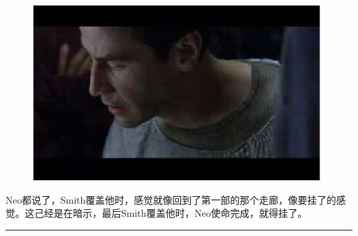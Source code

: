 \documentclass[UTF8]{ctexart}
\newcommand{\myparsep}{\noindent \rule[0.5ex]{\linewidth}{1pt}}
\begin{document}
\begin{figure}[htb]
\centering
\includegraphics[width=0.5\linewidth]{fig/read_reloaded-83}
\end{figure}

Neo都说了，Smith覆盖他时，感觉就像回到了第一部的那个走廊，像要挂了的感觉。这己经是在暗示，最后Smith覆盖他时，Neo使命完成，就得挂了。

\myparsep
\end{document}
